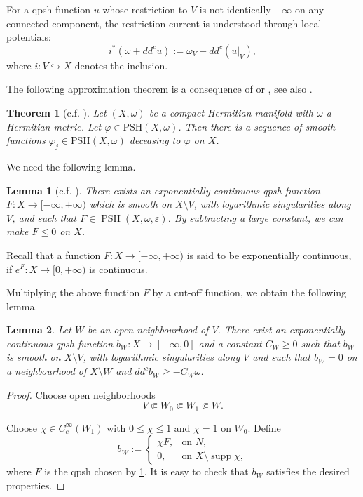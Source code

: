 \documentclass[12pt,reqno]{amsart}
\newtheorem{thm}{Theorem}[section]
\newtheorem{lem}{Lemma}[section]
\newcommand{\PSH}{\operatorname{PSH}}
\newcommand{\ddc}{dd^c}
\newcommand{\supp}{\operatorname{supp}}
\newcommand{\restr}[2]{\left.#1\right|_{#2}}
\begin{document}
	For a qpsh function $u$ whose restriction to $V$ is not identically $-\infty$ on any connected component, the restriction current is understood through local potentials:
	\[
	i^*(\omega+\ddc u):=\omega_V+\ddc(\restr{u}{V}),
	\]
	where $i\colon V\hookrightarrow X$ denotes the inclusion.
	
	
	The following approximation theorem is a consequence of  \cite[Theorem 2.3]{DPS01} or   \cite[Theorem 3.2]{DP04}, see also \cite[Theorem 1]{BK07}.
	
	\begin{thm}[c.f. \cite{DPS01,DP04,BK07}]\label{thm: appro}
		Let $(X,\omega)$ be a compact Hermitian manifold with $\omega$ a Hermitian metric. Let $\varphi\in \mbox{PSH}(X,\omega)$. Then there is a  sequence of smooth functions $\varphi_j\in \mbox{PSH}(X,\omega)$ deceasing to $\varphi$ on $X$.
	\end{thm}
	
	We need the  following lemma.
	\begin{lem}[c.f. \cite{DP04}]\label{reference function}
		There exists an exponentially continuous  qpsh function $F:X\rightarrow [-\infty, +\infty)$ which is smooth on $X\setminus V$, with logarithmic singularities along $V$, and such that $F\in \PSH(X,\omega, \varepsilon)$.
		By subtracting a large constant, we can make $F\leq 0$ on $X$.
	\end{lem}

	Recall that	a function $F:X\rightarrow [-\infty,+\infty)$ is said to be exponentially continuous, if $e^F:X\rightarrow [0,+\infty)$ is continuous.

	
Multiplying the above function $F$ by a cut-off function, we obtain the following lemma.
	
	\begin{lem}\label{lem:barrier}
		Let $W$ be an open neighbourhood of $V$.	There exist an exponentially continuous qpsh function $b_W\colon X\longrightarrow[-\infty,0]$
		and a constant $C_W\geq0$ such that $b_W$ is smooth on $X\setminus V$, with logarithmic singularities along $V$ and such that $b_W=0$ on a neighbourhood of $X\setminus W$ and $\ddc b_W\geq-C_W\omega$.
	\end{lem}
	
	\begin{proof}
		Choose open neighborhoods
		\[
		V\Subset W_0\Subset W_1\Subset W.
		\]
		
		Choose $\chi\in C_c^\infty(W_1)$ with $0\leq\chi\leq1$ and $\chi=1$ on $W_0$. Define
		\[
		b_W:=
		\begin{cases}
			\chi F,&\text{on }N,\\
			0,&\text{on }X\setminus\supp\chi,
		\end{cases}
		\]
		where $F$ is the qpsh chosen by \cref{reference function}.
		It is easy to check that $b_W$ satisfies the desired properties.
	\end{proof}
	
\end{document}
